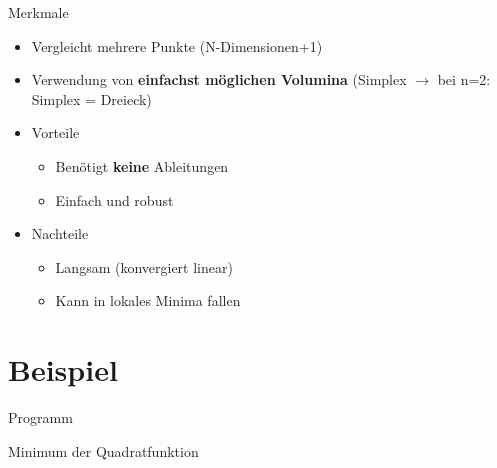 \documentclass[\outputformat]{beamer}
\begin{document}
\begin{frame}{Merkmale}
\begin{itemize}
	\item Vergleicht mehrere Punkte (N-Dimensionen+1)
	\item Verwendung von \textbf{einfachst möglichen Volumina} (Simplex $\rightarrow$ bei n=2: Simplex = Dreieck)
	\item Vorteile
	\begin{itemize}
		\item Benötigt \textbf{keine} Ableitungen
		\item Einfach und robust
	\end{itemize}
	\item Nachteile
	\begin{itemize}
		\item Langsam (konvergiert linear)
		\item Kann in lokales Minima fallen
	\end{itemize} 
\end{itemize}
\end{frame}




\section{Beispiel}
\begin{frame}{Programm}\tableofcontents[currentsection]\end{frame}

\begin{frame}{Minimum der Quadratfunktion}

\end{frame}
\end{document}
